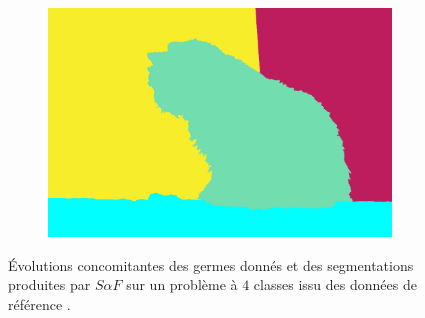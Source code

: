 \begin{figure}[htb]
\begin{subfigure}{0.4\textwidth}
 \end{subfigure}
 ~
 \begin{subfigure}{0.45\textwidth}	
\includegraphics[width=\textwidth]{images/evaluation/004_res3.jpg}
 \end{subfigure}
\caption{Évolutions concomitantes des germes donnés et des segmentations produites par $S \alpha F$ sur un problème à $4$ classes issu des données de référence .}
	\label{fig:eval:Algo-predictability-2}
\end{figure} 

